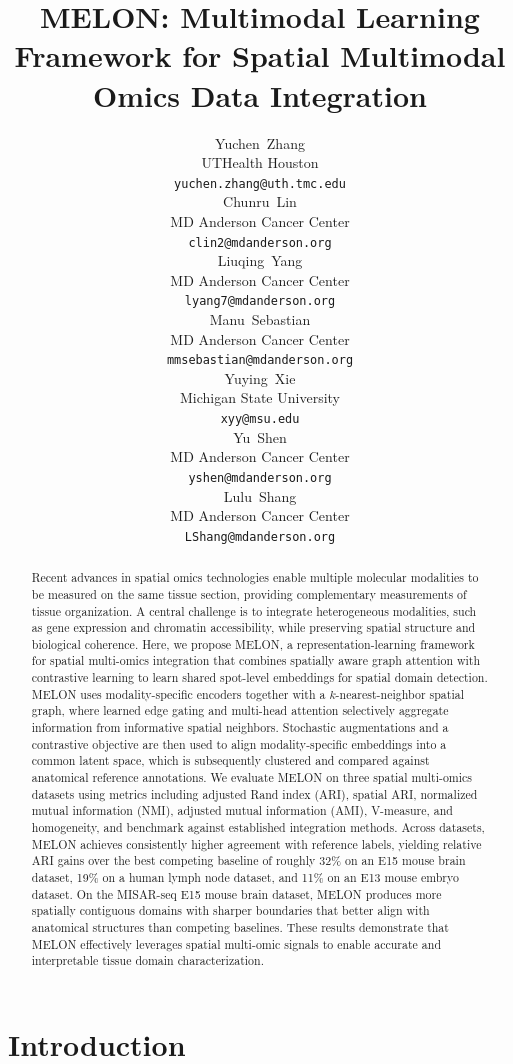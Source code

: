 \documentclass{article}
\title{MELON: Multimodal Learning Framework for Spatial Multimodal Omics Data Integration}
\author{%
  Yuchen~Zhang \\
  UTHealth Houston \\
  \texttt{yuchen.zhang@uth.tmc.edu} \\
  \And
  Chunru~Lin \\
  MD Anderson Cancer Center \\
  \texttt{clin2@mdanderson.org} \\
  \And
  Liuqing~Yang \\
  MD Anderson Cancer Center \\
  \texttt{lyang7@mdanderson.org} \\
  \AND
  Manu~Sebastian \\
  MD Anderson Cancer Center \\
  \texttt{mmsebastian@mdanderson.org} \\
  \And
  Yuying~Xie \\
  Michigan State University \\
  \texttt{xyy@msu.edu} \\
  \And
  Yu~Shen \\
  MD Anderson Cancer Center \\
  \texttt{yshen@mdanderson.org} \\
  \And
  Lulu~Shang \\
  MD Anderson Cancer Center \\
  \texttt{LShang@mdanderson.org} \\
}
\theoremstyle{plain}
\theoremstyle{definition}
\begin{document}
\maketitle

\begin{abstract}
  Recent advances in spatial omics technologies enable multiple molecular modalities to be measured on the same tissue section, providing
  complementary measurements of tissue organization. A central challenge is to integrate heterogeneous modalities, such as gene expression and chromatin accessibility, while preserving spatial structure and biological coherence. Here, we propose MELON, a representation-learning framework for spatial multi-omics integration that combines spatially aware graph attention with contrastive learning to learn shared spot-level embeddings for spatial domain detection. MELON uses modality-specific encoders together with a $k$-nearest-neighbor spatial graph, where learned edge gating and multi-head attention selectively aggregate information from informative spatial neighbors. Stochastic
  augmentations and a contrastive objective are then used to align modality-specific embeddings into a common latent space, which is subsequently clustered and compared against anatomical reference annotations. We evaluate MELON on three spatial multi-omics datasets using metrics including adjusted Rand index (ARI), spatial ARI, normalized mutual
  information (NMI), adjusted mutual information (AMI), V-measure, and homogeneity, and benchmark against established integration methods. Across datasets, MELON achieves consistently higher agreement with reference labels, yielding relative ARI gains over the best competing baseline of roughly 32\% on an E15 mouse brain dataset, 19\% on a human lymph node dataset, and 11\% on an E13 mouse embryo dataset. On the MISAR-seq E15 mouse brain dataset, MELON produces more spatially contiguous domains with sharper boundaries that better align with anatomical structures than competing baselines. These results demonstrate that MELON effectively leverages spatial multi-omic signals to enable accurate and interpretable tissue domain characterization.
\end{abstract}

\section{Introduction}
\end{document}

